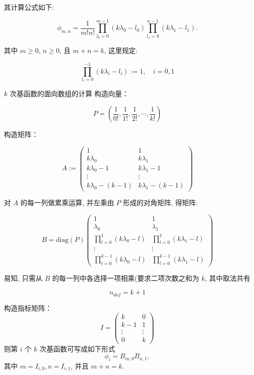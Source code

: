 \documentclass{article}
\begin{document}
其计算公式如下:

\[
\phi_{m,n} = \frac{1}{m!n!}\prod_{l_0 = 0}^{m - 1}
(k\lambda_0 - l_0) \prod_{l_1 = 0}^{n-1}(k\lambda_1 -
l_1).
\]

其中 $ m\geq 0$, $ n\geq 0 $, 且 $ m+n=k $, 这里规定:

\[
 \prod_{l_i=0}^{-1}(k\lambda_i - l_i) := 1,\quad i=0, 1
\]

$k$ 次基函数的面向数组的计算
构造向量： 

\[
P = ( \frac{1}{0!},  \frac{1}{1!}, \frac{1}{2!}, \cdots, \frac{1}{k!})
\]

构造矩阵： 

\[
A :=
\begin{pmatrix}
1  &  1  \\
k\lambda_0 & k\lambda_1\\
k\lambda_0 - 1 & k\lambda_1 - 1\\
\vdots & \vdots \\
k\lambda_0 - (k - 1) & k\lambda_1 - (k - 1)
\end{pmatrix}
\]

对 $A$ 的每一列做累乘运算, 并左乘由 $P$ 形成的对角矩阵, 得矩阵:

\[
B = \mathrm{diag}(P)
\begin{pmatrix}
1 & 1\\
\lambda_0 & \lambda_1\\
\prod_{l=0}^{1}(k\lambda_0 - l) & \prod_{l=0}^{1}(k\lambda_1 - l)\\
\vdots & \vdots \\
\prod_{l=0}^{k-1}(k\lambda_0 - l) & \prod_{l=0}^{k-1}(k\lambda_1 - l)
\end{pmatrix}
\]

易知, 只需从 $B$ 的每一列中各选择一项相乘(要求二项次数之和为 $k$,
其中取法共有

\[
n_{dof} = {k+1}
\]

构造指标矩阵：
\[
I = \begin{pmatrix}
k  & 0 \\ k-1 & 1 \\ \vdots & \vdots \\ 0 & k
\end{pmatrix}
\]
则第 $i$ 个 $k$ 次基函数可写成如下形式
\[
\phi_i = B_{m,0}B_{n,1}, 
\]
其中 $ m = I_{i, 0}, n = I_{i, 1} $, 并且 $ m + n = k$.
\end{document}
